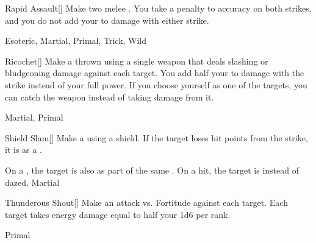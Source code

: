 \lowercase{\hypertarget{maneuver:Rapid Assault}{}}\label{maneuver:Rapid Assault}
\hypertarget{maneuver:Rapid Assault}{}
\begin{freeability}[Rank 3]{Rapid Assault}[]
Make two melee .
You take a  penalty to accuracy on both strikes, and you do not add your  to damage with either strike.


 Esoteric, Martial, Primal, Trick, Wild
\end{freeability}
\vspace{0.25em}



\lowercase{\hypertarget{maneuver:Ricochet}{}}\label{maneuver:Ricochet}
\hypertarget{maneuver:Ricochet}{}
\begin{freeability}[Rank 3]{Ricochet}[]
Make a thrown  using a single weapon that deals slashing or bludgeoning damage against each target.
You add half your  to damage with the strike instead of your full power.
If you choose yourself as one of the targets, you can catch the weapon instead of taking damage from it.


 Martial, Primal
\end{freeability}
\vspace{0.25em}



\lowercase{\hypertarget{maneuver:Shield Slam}{}}\label{maneuver:Shield Slam}
\hypertarget{maneuver:Shield Slam}{}
\begin{freeability}[Rank 3]{Shield Slam}[]
Make a  using a shield.
If the target loses hit points from the strike, it is  as a .

\rankline
{} On a , the target is also  as part of the same .
 On a hit, the target is  instead of dazed.
 Martial
\end{freeability}
\vspace{0.25em}



\lowercase{\hypertarget{maneuver:Thunderous Shout}{}}\label{maneuver:Thunderous Shout}
\hypertarget{maneuver:Thunderous Shout}{}
\begin{freeability}[Rank 3]{Thunderous Shout}[]
Make an attack vs. Fortitude against each target.
\hit Each target takes energy damage equal to half your  \add 1d6 per rank.


 Primal
\end{freeability}
\vspace{0.25em}



